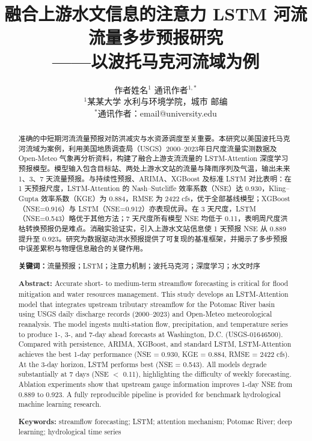 \documentclass[12pt,a4paper]{article}
\title{\textbf{融合上游水文信息的注意力 LSTM 河流流量多步预报研究}\\[0.5em]
\large ——以波托马克河流域为例}
\author{作者姓名$^{1}$ \quad 通讯作者$^{1,*}$\\
\small $^{1}$某某大学 水利与环境学院，城市 邮编\\
\small $^{*}$通讯作者：email@university.edu}
\date{}
\begin{document}
\maketitle

\begin{abstract}
准确的中短期河流流量预报对防洪减灾与水资源调度至关重要。本研究以美国波托马克河流域为案例，利用美国地质调查局（USGS）2000--2023年日尺度流量实测数据及 Open-Meteo 气象再分析资料，构建了融合上游支流流量的 LSTM-Attention 深度学习预报模型。模型输入包含目标站、两处上游水文站的流量与降雨序列及气温，输出未来 1、3、7 天流量预报。与持续性预报、ARIMA、XGBoost 及标准 LSTM 对比表明：在 1 天预报尺度，LSTM-Attention 的 Nash--Sutcliffe 效率系数（NSE）达 0.930，Kling--Gupta 效率系数（KGE）为 0.884，RMSE 为 2422 cfs，优于全部基线模型；XGBoost（NSE=0.916）与 LSTM（NSE=0.912）亦表现优异。在 3 天尺度，LSTM（NSE=0.543）略优于其他方法；7 天尺度所有模型 NSE 均低于 0.11，表明周尺度洪枯转换预报仍是难点。消融实验证实，引入上游水文站信息使 1 天预报 NSE 从 0.889 提升至 0.923。研究为数据驱动洪水预报提供了可复现的基准框架，并揭示了多步预报中误差累积与物理信息融合的关键作用。

\textbf{关键词：}流量预报；LSTM；注意力机制；波托马克河；深度学习；水文时序
\end{abstract}

\begin{abstract}
\noindent\textbf{Abstract:} Accurate short- to medium-term streamflow forecasting is critical for flood mitigation and water resources management. This study develops an LSTM-Attention model that integrates upstream tributary streamflow for the Potomac River basin using USGS daily discharge records (2000--2023) and Open-Meteo meteorological reanalysis. The model ingests multi-station flow, precipitation, and temperature series to produce 1-, 3-, and 7-day ahead forecasts at Washington, D.C. (USGS-01646500). Compared with persistence, ARIMA, XGBoost, and standard LSTM, LSTM-Attention achieves the best 1-day performance (NSE = 0.930, KGE = 0.884, RMSE = 2422 cfs). At the 3-day horizon, LSTM performs best (NSE = 0.543). All models degrade substantially at 7 days (NSE $<$ 0.11), highlighting the difficulty of weekly forecasting. Ablation experiments show that upstream gauge information improves 1-day NSE from 0.889 to 0.923. A fully reproducible pipeline is provided for benchmark hydrological machine learning research.

\noindent\textbf{Keywords:} streamflow forecasting; LSTM; attention mechanism; Potomac River; deep learning; hydrological time series
\end{abstract}
\end{document}

